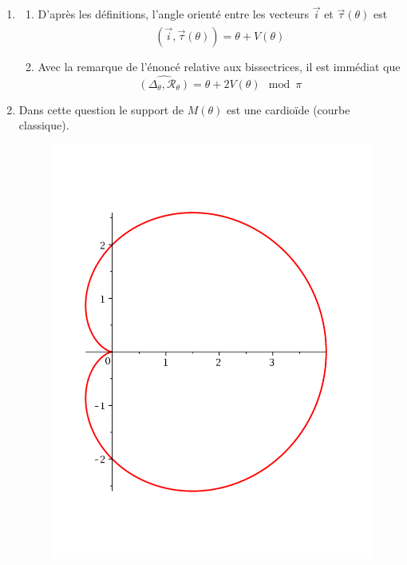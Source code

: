 \begin{enumerate}
\item \begin{enumerate}
  \item D'après les définitions, l'angle orienté entre les vecteurs $\overrightarrow{i}$ et $\overrightarrow{\tau}(\theta)$ est 
\begin{displaymath}
 \widehat{(\overrightarrow{i} , \overrightarrow{\tau}(\theta))} = \theta + V(\theta)
\end{displaymath}
  \item Avec la remarque de l'énoncé relative aux bissectrices, il est immédiat que
\begin{displaymath}
 \widehat{(\Delta_\theta,\mathcal{R}_\theta)} = \theta + 2V(\theta) \mod \pi
\end{displaymath}
\end{enumerate}
\item Dans cette question le support de $M(\theta)$ est une cardioïde (courbe classique).
\begin{figure}
   \centering
   \includegraphics[scale=0.25]{Ccaustic_1.pdf}

\end{figure}
\end{enumerate}
